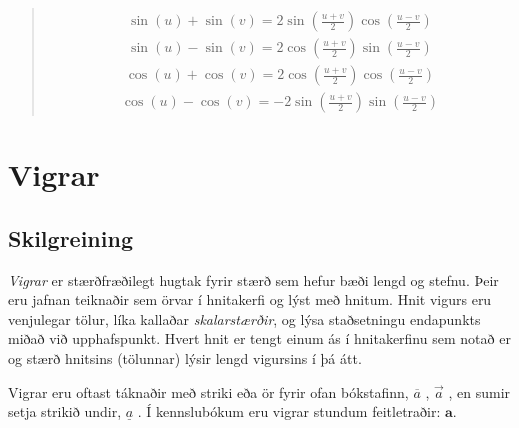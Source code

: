 \documentclass[a4paper,10pt,icelandic]{sphinxmanual}
\begin{document}
\begin{quote}

\begin{equation*}
\begin{split}\sin(u) + \sin(v) = 2\sin\left(\frac{u+v}{2}\right)\cos\left(\frac{u-v}{2}\right)\end{split}
\end{equation*}
\begin{equation*}
\begin{split}\sin(u) - \sin(v) = 2\cos\left(\frac{u+v}{2}\right)\sin\left(\frac{u-v}{2}\right)\end{split}
\end{equation*}
\begin{equation*}
\begin{split}\cos(u) + \cos(v) = 2\cos\left(\frac{u+v}{2}\right)\cos\left(\frac{u-v}{2}\right)\end{split}
\end{equation*}
\begin{equation*}
\begin{split}\cos(u) - \cos(v) = -2\sin\left(\frac{u+v}{2}\right)\sin\left(\frac{u-v}{2}\right)\end{split}
\end{equation*}\end{quote}


\chapter{Vigrar}
\label{\detokenize{Kafli08:vigrar}}\label{\detokenize{Kafli08::doc}}

\section{Skilgreining}
\label{\detokenize{Kafli08:skilgreining}}\label{\detokenize{Kafli08:s-vigrar}}
\textit{Vigrar} er stærðfræðilegt hugtak fyrir stærð sem hefur bæði lengd og stefnu.
Þeir eru jafnan teiknaðir sem örvar í hnitakerfi og lýst með hnitum.
Hnit vigurs eru venjulegar tölur, líka kallaðar \textit{skalarstærðir}, og lýsa staðsetningu endapunkts miðað við upphafspunkt.
Hvert hnit er tengt einum ás í hnitakerfinu sem notað er og stærð hnitsins (tölunnar) lýsir lengd vigursins í þá átt.

Vigrar eru oftast táknaðir með striki eða ör fyrir ofan bókstafinn, \(\overline{a}\) , \(\vec{a}\) , en sumir setja strikið undir, \(\underline{a}\) .
Í kennslubókum eru vigrar stundum feitletraðir: \(\boldsymbol{a}\).
\end{document}
